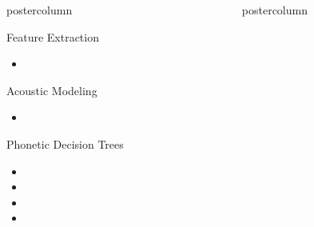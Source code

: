 \documentclass[final,hyperref={pdfpagelabels=false}]{beamer}
\newlength{\columnheight}
\begin{document}
\begin{frame}
\begin{columns}
\begin{column}{.49\textwidth}
\begin{beamercolorbox}[center,wd=\textwidth]{postercolumn}
\begin{minipage}[T]{.95\textwidth}
{
            \vfill
            \begin{block}{Feature Extraction}
              \begin{itemize}
              \item 
              \end{itemize}
            \end{block}
            \vfill
            \begin{block}{Acoustic Modeling}
              \begin{itemize}
              \item 
              \end{itemize}
            \end{block}
            \vfill
            \begin{block}{Phonetic Decision Trees}
              \begin{itemize}
              \item 
              \item 
              \item 
              \item 
              \end{itemize}
            \end{block}
          }
        \end{minipage}
      \end{beamercolorbox}
    \end{column}

    \begin{column}{.49\textwidth}
      \begin{beamercolorbox}[center,wd=\textwidth]{postercolumn}
        \begin{minipage}[T]{.95\textwidth} %
          \parbox[t][\columnheight]{\textwidth}{ %
            
}
\end{minipage}
\end{beamercolorbox}
\end{column}
\end{columns}
\end{frame}
\end{document}
